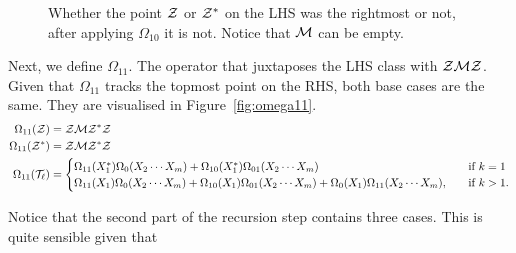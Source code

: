 \documentclass[12pt, a4paper, twoside]{report}
\begin{document}
\begin{figure}[ht]
    \centering
    \caption{Whether the point $\mathcal{Z}$ or $\mathcal{Z}^*$ on the LHS was the rightmost or not, after applying $\Omega_{10}$ it is not. Notice that $\mathcal{M}$ can be empty.}
    \label{fig:omega_10}
\end{figure}
Next, we define $\Omega_{11}$. The operator that juxtaposes the LHS class with $\mathcal{Z}\mathcal{M}\mathcal{Z}$. Given that $\Omega_{11}$ tracks the topmost point on the RHS, both base cases are the same. They are visualised in Figure~\ref{fig:omega11}.
\begin{align}
  \begin{aligned}
  \Omega_{11}(\mathcal{Z}) &= \mathcal{Z}\mathcal{M}\mathcal{Z}^*\mathcal{Z}\\
  \Omega_{11}(\mathcal{Z}^*) &= \mathcal{Z}\mathcal{M}\mathcal{Z}^*\mathcal{Z}\\
  \Omega_{11}(\mathcal{T}_\ell) &=
                      \begin{cases}
                        \Omega_{11}(X_1^*)\Omega_0(X_2\cdots X_m)+\Omega_{10}(X_1^*)\Omega_{01}(X_2\cdots X_m) \quad &\text{if $k = 1$}\\
                        \Omega_{11}(X_1)\Omega_0(X_2\cdots X_m) + \Omega_{10}(X_1)\Omega_{01}(X_2\cdots X_m) + \Omega_0(X_1)\Omega_{11}(X_2\cdots X_m),\quad &\text{if $k>1$.}
                      \end{cases}
                    \end{aligned}
\label{eq:omega11Cstar}
\end{align}

Notice that the second part of the recursion step contains three cases. This is quite sensible given that 
\end{document}

